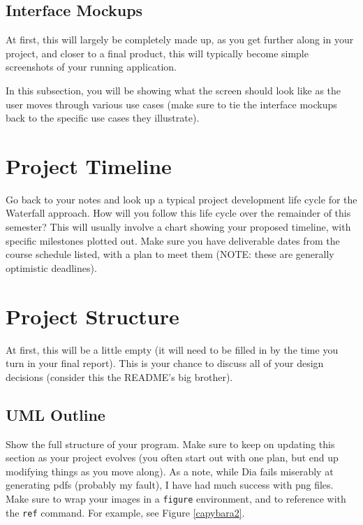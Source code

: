\documentclass[10pt,conference,onecolumn,compsoc]{IEEEtran}
\begin{document}
\subsection{Interface Mockups}
At first, this will largely be completely made up, as you get further along in your project, and closer to a final product, this will typically become simple screenshots of your running application.

In this subsection, you will be showing what the screen should look like as the user moves through various use cases (make sure to tie the interface mockups back to the specific use cases they illustrate).



\section{Project Timeline}
Go back to your notes and look up a typical project development life cycle for the Waterfall approach.  How will you follow this life cycle over the remainder of this semester?  This will usually involve a chart showing your proposed timeline, with specific milestones plotted out.  Make sure you have deliverable dates from the course schedule listed, with a plan to meet them (NOTE: these are generally optimistic deadlines).



\section{Project Structure}
At first, this will be a little empty (it will need to be filled in by the time you turn in your final report).  This is your chance to discuss all of your design decisions (consider this the README's big brother).

\subsection{UML Outline}
Show the full structure of your program.  Make sure to keep on updating this section as your project evolves (you often start out with one plan, but end up modifying things as you move along).  As a note, while Dia fails miserably at generating pdfs (probably my fault), I have had much success with png files.  Make sure to wrap your images in a \texttt{figure} environment, and to reference with the \texttt{ref} command.  For example, see Figure \ref{capybara2}.
\end{document}
